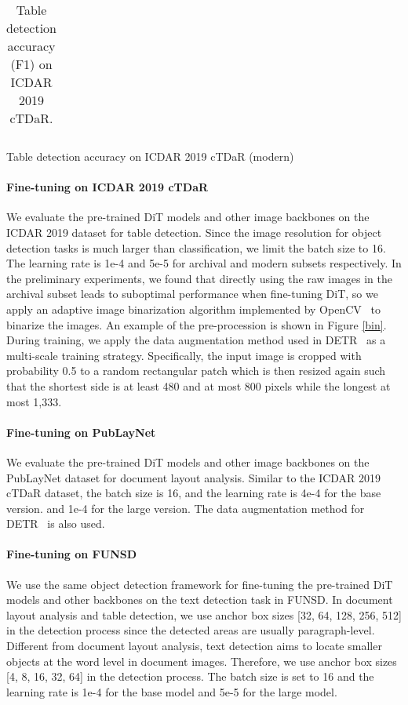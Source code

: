 \documentclass[sigconf]{acmart}
\begin{document}
\begin{table*}[t]
\begin{subtable}[ht]{1\textwidth}
\begin{tabular}{cccccc}
    \bottomrule
    \end{tabular}\caption{Table detection accuracy on ICDAR 2019 cTDaR (modern)}
    \label{tab:table_modern}
\end{subtable}    
\caption{Table detection accuracy (F1) on ICDAR 2019 cTDaR.}
\label{tab:table_icdar}
\end{table*}

\paragraph{Fine-tuning on ICDAR 2019 cTDaR}
We evaluate the pre-trained DiT models and other image backbones on the ICDAR 2019 dataset for table detection. Since the image resolution for object detection tasks is much larger than classification, we limit the batch size to 16. The learning rate is 1e-4 and 5e-5 for archival and modern subsets respectively. In the preliminary experiments, we found that directly using the raw images in the archival subset leads to suboptimal performance when fine-tuning DiT, so we apply an adaptive image binarization algorithm implemented by OpenCV~\citep{opencv_library} to binarize the images. An example of the pre-procession is shown in Figure \ref{bin}. During training, we apply the data augmentation method used in DETR~\citep{carion2020end} as a multi-scale training strategy. Specifically, the input image is cropped with probability 0.5 to a random rectangular patch which is then resized again such that the shortest side is at least 480 and at most 800 pixels while the longest at most 1,333.



\paragraph{Fine-tuning on PubLayNet}
We evaluate the pre-trained DiT models and other image backbones on the PubLayNet dataset for document layout analysis. Similar to the ICDAR 2019 cTDaR dataset, the batch size is 16, and the learning rate is 4e-4 for the base version. and 1e-4 for the large version. The data augmentation method for DETR~\citep{carion2020end} is also used.

\paragraph{Fine-tuning on FUNSD}
We use the same object detection framework for fine-tuning the pre-trained DiT models and other backbones on the text detection task in FUNSD. In document layout analysis and table detection, we use anchor box sizes [32, 64, 128, 256, 512] in the detection process since the detected areas are usually paragraph-level. Different from document layout analysis, text detection aims to locate smaller objects at the word level in document images. Therefore, we use anchor box sizes [4, 8, 16, 32, 64] in the detection process. The batch size is set to 16 and the learning rate is 1e-4 for the base model and 5e-5 for the large model.
\end{document}

